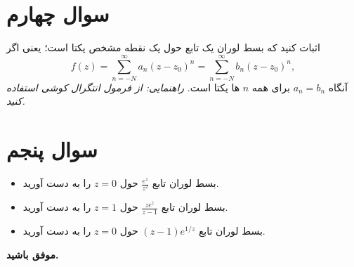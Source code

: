 \documentclass[a4paper,16pt]{article}
\begin{document}
	\section{سوال چهارم}
	
	اثبات کنید که بسط لوران یک تابع حول یک نقطه مشخص یکتا است؛ یعنی اگر
	\[
	f(z) = \sum_{n=-N}^{\infty} a_n (z-z_0)^n = \sum_{n=-N}^{\infty} b_n (z-z_0)^n,
	\]  
	آنگاه \(a_n = b_n\) برای همه \(n\) ها یکتا است.  
	\textit{راهنمایی: از فرمول انتگرال کوشی استفاده کنید.}
	\section{سوال پنجم}
	\begin{itemize}
	\item بسط لوران تابع \(\frac{e^z}{z^2}\) حول \(z=0\) را به دست آورید.
	\item بسط لوران تابع \(\frac{z e^z}{z-1}\) حول \(z=1\) را به دست آورید.
	\item بسط لوران تابع \((z-1)e^{1/z}\) حول \(z=0\) را به دست آورید.
	\end{itemize}


	\textbf{موفق باشید.}
\end{document}
